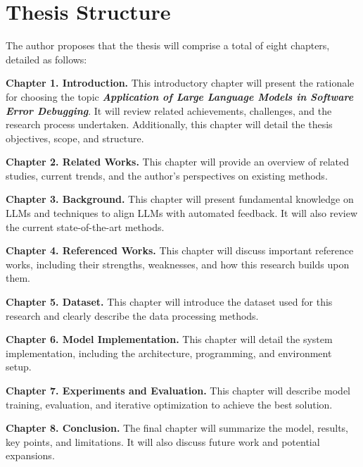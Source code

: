 \documentclass[a4paper,oneside]{book}
\begin{document}
\chapter{Thesis Structure}
The author proposes that the thesis will comprise a total of eight chapters, detailed as follows:

\textbf{Chapter 1. Introduction.} This introductory chapter will present the rationale for choosing the topic \textbf{\textit{Application of Large Language Models in Software Error Debugging}}. It will review related achievements, challenges, and the research process undertaken. Additionally, this chapter will detail the thesis objectives, scope, and structure.

\textbf{Chapter 2. Related Works.} This chapter will provide an overview of related studies, current trends, and the author's perspectives on existing methods.

\textbf{Chapter 3. Background.} This chapter will present fundamental knowledge on LLMs and techniques to align LLMs with automated feedback. It will also review the current state-of-the-art methods.

\textbf{Chapter 4. Referenced Works.} This chapter will discuss important reference works, including their strengths, weaknesses, and how this research builds upon them.

\textbf{Chapter 5. Dataset.} This chapter will introduce the dataset used for this research and clearly describe the data processing methods.

\textbf{Chapter 6. Model Implementation.} This chapter will detail the system implementation, including the architecture, programming, and environment setup.

\textbf{Chapter 7. Experiments and Evaluation.} This chapter will describe model training, evaluation, and iterative optimization to achieve the best solution.

\textbf{Chapter 8. Conclusion.} The final chapter will summarize the model, results, key points, and limitations. It will also discuss future work and potential expansions.
\end{document}
